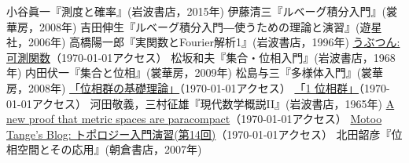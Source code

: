 \documentclass[a4paper,11pt]{jsarticle}
\begin{document}
%
%
%
%
\begin{thebibliography}{99}
  小谷眞一『測度と確率』(岩波書店，2015年)
  伊藤清三『ルベーグ積分入門』(裳華房，2008年)
  吉田伸生『ルベーグ積分入門―使うための理論と演習』(遊星社，2006年)
  高橋陽一郎『実関数とFourier解析1』(岩波書店，1996年)
  \href{http://ubutun.blogspot.jp/2010/01/blog-post_23.html}{うぶつん: 可測関数}（\today アクセス）
  松坂和夫『集合・位相入門』(岩波書店，1968年)
  内田伏一『集合と位相』(裳華房，2009年)
  松島与三『多様体入門』(裳華房，2008年)
  \href{https://www.google.co.jp/url?sa=t\&rct=j\&q=\&esrc=s\&source=web\&cd=5\&ved=0ahUKEwj_s87F0ozPAhUJ82MKHRk3DN4QFgg1MAQ\&url=http\%3A\%2F\%2Fwww.geocities.jp\%2Faoirei2002\%2Fmath\%2Fpapers\%2Ftopogp.pdf\&usg=AFQjCNEbVslzl1jcHi8vqBaBZg2nf3ElEQ\&sig2=cPgs9ru-pSSlnvH9Wq-3JQ\&bvm=bv.132479545,d.dGo}{「位相群の基礎理論」}（\today アクセス）
  \href{http://mathematics-pdf.com/pdf/top_grp.pdf}{「1 位相群」}（\today アクセス）
  河田敬義，三村征雄『現代数学概説II』(岩波書店，1965年)
  \href{http://www.ams.org/journals/proc/1969-020-02/S0002-9939-1969-0236876-3/S0002-9939-1969-0236876-3.pdf}{A new proof that metric spaces are paracompact}（\today アクセス）
  \href{http://motochans.blogspot.jp/2016/02/14.html}{Motoo Tange's Blog: トポロジー入門演習(第14回)}（\today アクセス）
  北田韶彦『位相空間とその応用』(朝倉書店，2007年)
\begin{comment}
\bibitem{yano}
  矢野 公一『距離空間と位相構造』(共立出版，1997年)
\bibitem{cantor1}
  \href{http://detail.chiebukuro.yahoo.co.jp/qa/question_detail/q1339680048}{Eが閉集合となるための条件は、Eの集積点はすべてEに属することである ...}（\today アクセス）
\bibitem{cantor2}
  \href{http://detail.chiebukuro.yahoo.co.jp/qa/question_detail/q12153110757}{3進カントール集合がperfectであることを示せ。 ... - 大学数学 | Yahoo!知恵袋}（\today アクセス）
\bibitem{cantor3}
  \href{http://math.stackexchange.com/questions/201922/proof-that-a-perfect-set-is-uncountable}{real analysis - Proof that a perfect set is uncountable - Mathematics Stack Exchange}（\today アクセス）
\bibitem{cantor4}
  \href{http://www.ams.org/journals/proc/1974-046-01/S0002-9939-1974-0345083-7/S0002-9939-1974-0345083-7.pdf}{sets to compact metric spaces - American Mathematical Society}（\today アクセス）
\end{comment}
\end{thebibliography}
%
%
%
%
\end{document}
